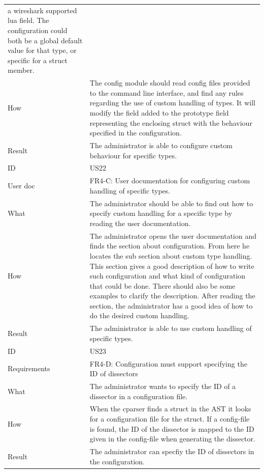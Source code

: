 \begin{table}[htbp]
{\begin{tabularx}{1.2\textwidth}{l X}
 	a \Gls{wireshark} supported lua field. The configuration could both be a global default value for that type, or specific for a \gls{struct} \gls{member}. \\
	How & The config module should read config files provided to the command line interface, and find any rules regarding the use of custom handling of types.
 	It will modify the field added to the prototype field representing the enclosing \gls{struct} with the behaviour specified in the configuration. \\
	Result & The administrator is able to configure custom behaviour for specific types. \\
	\midrule
	ID & US22 \\
	User doc & FR4-C: User documentation for configuring custom handling of specific types. \\
	What & The administrator should be able to find out how to specify custom handling for a specific type by reading the user documentation.\\
	How & The administrator opens the user documentation and finds the section about configuration. From here he locates the sub section about custom type handling. 
	This section gives a good description of how to write such configuration and what kind of configuration that could be done. There should also be some
 	examples to clarify the description. After reading the section, the administrator has a good idea of how to do the desired custom handling. \\
	Result & The administrator is able to use custom handling of specific types. \\
	\midrule
	ID & US23 \\
	Requirements &  FR4-D: Configuration must support specifying the ID of \glspl{dissector} \\
	What & The administrator wants to specify the ID of a \gls{dissector} in a configuration file. \\
	How & When the cparser finds a \gls{struct} in the \gls{AST} it looks for a configuration file for the \gls{struct}. If a config-file is found, the ID of the \gls{dissector}
	is mapped to the ID given in the config-file when generating the \gls{dissector}. \\	
	Result & The administrator can specfiy the ID of \glspl{dissector} in the configuration. \\
	\midrule
	
\end{tabularx}}
\end{table}


